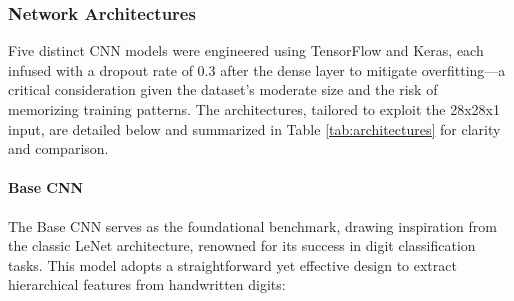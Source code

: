 \documentclass[12pt]{article}
\begin{document}
\subsubsection{Network Architectures}
Five distinct CNN models were engineered using TensorFlow and Keras, each infused with a dropout rate of 0.3 after the dense layer to mitigate overfitting—a critical consideration given the dataset's moderate size and the risk of memorizing training patterns. The architectures, tailored to exploit the 28x28x1 input, are detailed below and summarized in Table \ref{tab:architectures} for clarity and comparison.

\paragraph{Base CNN}
The Base CNN serves as the foundational benchmark, drawing inspiration from the classic LeNet architecture, renowned for its success in digit classification tasks. This model adopts a straightforward yet effective design to extract hierarchical features from handwritten digits:
\end{document}
